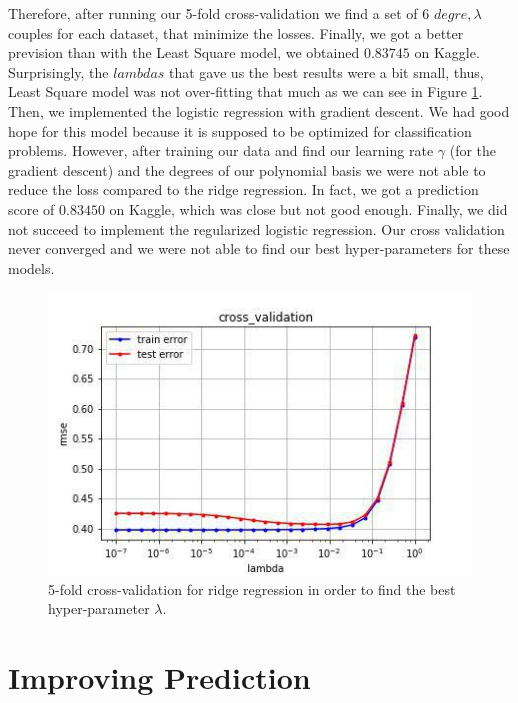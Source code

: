 \documentclass[10pt,conference,compsocconf]{IEEEtran}
\begin{document}
Therefore, after running our 5-fold cross-validation we find a set of 6 $degre, \lambda$ couples for each dataset, that minimize the losses. Finally, we got a better prevision than with the Least Square model, we obtained $0.83745$ on Kaggle. Surprisingly, the $lambdas$ that gave us the best results were a bit small, thus, Least Square model was not over-fitting that much as we can see in Figure \ref{fig:figure1}.
Then, we implemented the logistic regression with gradient descent. We had good hope for this model because it is supposed to be optimized for classification problems. However, after training our data and find our learning rate $\gamma$ (for the gradient descent) and the degrees of our polynomial basis we were not able to reduce the loss compared to the ridge regression. In fact, we got a prediction score of $0.83450$ on Kaggle, which was close but not good enough.
Finally, we did not succeed to implement the regularized logistic regression. Our cross validation never converged and we were not able to find our best hyper-parameters for these models.

\begin{figure}[tbp]
  \centering
  \includegraphics[width=\columnwidth]{cross-validation}
  \caption{5-fold cross-validation for ridge regression in order to find the best hyper-parameter $\lambda$.}
  \vspace{-3mm}
  \label{fig:figure1}
\end{figure}

\section{Improving Prediction}
\end{document}
